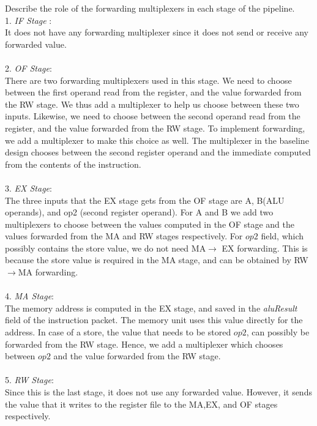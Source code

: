 \begin{ExerciseList}
\Exercise
Describe the role of the forwarding multiplexers in  each stage of the pipeline.
\Answer
\hspace{1mm} \\
1. \textit{IF Stage} :\\
It does not have any forwarding multiplexer since it does not send or receive any forwarded value. \\ \\
2. \textit{OF Stage}: \\
There are two forwarding multiplexers used in this stage. We need to choose between the first operand read from the register, and the value forwarded from the RW stage. We thus add a multiplexer to help us choose between these two inputs. Likewise, we need to choose between the second operand read from the register, and the value forwarded from the RW stage. To implement   forwarding, we add a multiplexer to make this choice as well. The multiplexer in the baseline design chooses between the second register operand and the immediate computed from the contents of the instruction. \\ \\
3. \textit{EX Stage}: \\
The three inputs that the EX stage gets from the OF stage are A, B(ALU operands), and op2 (second register operand). For A and B we add two multiplexers to choose between the values computed in the OF stage and the values forwarded from the MA and RW stages respectively. For $op2$ field, which possibly contains the store value, we do not need MA$\rightarrow$ EX forwarding. This is because the store value is required in the MA stage, and can be obtained by RW$\rightarrow$MA forwarding. \\ \\
4. \textit{MA Stage}: \\
The memory address is computed in the EX stage, and saved in the \textit{aluResult} field of the instruction packet. The memory unit uses this value directly for the address. In case of a store, the value that needs to be stored $op2$, can possibly be forwarded from the RW stage. Hence, we add a multiplexer which chooses between $op2$ and the value forwarded from the RW stage. \\ \\ 
5. \textit{RW Stage}: \\
Since this is the last stage, it does not use any forwarded value. However, it sends the value that it writes to the register file to the MA,EX, and OF stages respectively. 


\end{ExerciseList}
